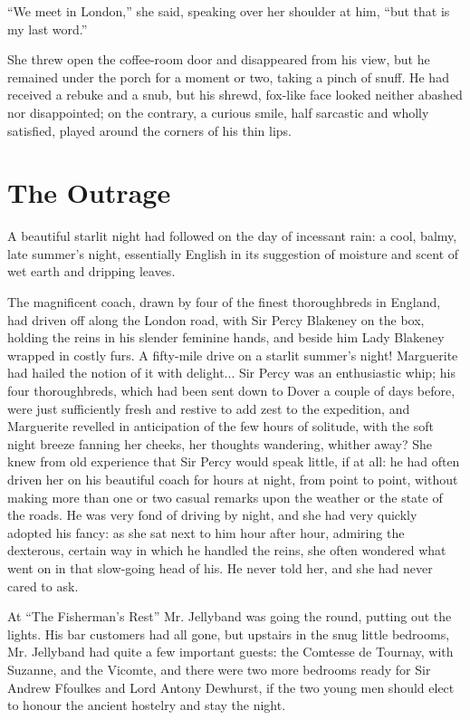 \documentclass[paper=5.5in:8.5in,BCOR=7mm,twoside,DIV=calc,12pt,usegeometry,chapterprefix,endperiod,headings=big]{scrbook}
\begin{document}
\enquote{We meet in London,} she said, speaking over her shoulder at him, \enquote{but that is my last word.}

She threw open the coffee-room door and disappeared from his view, but he remained under the porch for a moment or two, taking a pinch of snuff. He had received a rebuke and a snub, but his shrewd, fox-like face looked neither abashed nor disappointed; on the contrary, a curious smile, half sarcastic and wholly satisfied, played around the corners of his thin lips.

\chapter{The Outrage}
\lettrine[lines=4]{A}{} beautiful starlit night had followed on the day of incessant rain: a cool, balmy, late summer's night, essentially English in its suggestion of moisture and scent of wet earth and dripping leaves.

The magnificent coach, drawn by four of the finest thoroughbreds in England, had driven off along the London road, with Sir Percy Blakeney on the box, holding the reins in his slender feminine hands, and beside him Lady Blakeney wrapped in costly furs. A fifty-mile drive on a starlit summer's night! Marguerite had hailed the notion of it with delight... Sir Percy was an enthusiastic whip; his four thoroughbreds, which had been sent down to Dover a couple of days before, were just sufficiently fresh and restive to add zest to the expedition, and Marguerite revelled in anticipation of the few hours of solitude, with the soft night breeze fanning her cheeks, her thoughts wandering, whither away? She knew from old experience that Sir Percy would speak little, if at all: he had often driven her on his beautiful coach for hours at night, from point to point, without making more than one or two casual remarks upon the weather or the state of the roads. He was very fond of driving by night, and she had very quickly adopted his fancy: as she sat next to him hour after hour, admiring the dexterous, certain way in which he handled the reins, she often wondered what went on in that slow-going head of his. He never told her, and she had never cared to ask.

At \enquote{The Fisherman's Rest} Mr. Jellyband was going the round, putting out the lights. His bar customers had all gone, but upstairs in the snug little bedrooms, Mr. Jellyband had quite a few important guests: the Comtesse de Tournay, with Suzanne, and the Vicomte, and there were two more bedrooms ready for Sir Andrew Ffoulkes and Lord Antony Dewhurst, if the two young men should elect to honour the ancient hostelry and stay the night.
\end{document}
